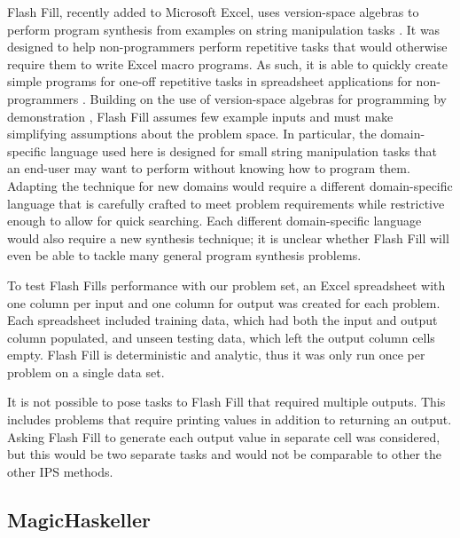Flash Fill, recently added to Microsoft Excel, uses version-space algebras to perform program synthesis from examples on string manipulation tasks \cite{Gulwani2011}. It was designed to help non-programmers perform repetitive tasks that would otherwise require them to write Excel macro programs. As such, it is able to quickly create simple programs for one-off repetitive tasks in spreadsheet applications for non-programmers \cite{Gulwani:2012:SDM:2240236.2240260, harris2011spreadsheet, Singh:2012:LSS:2212351.2212356, singh2012synthesizing}. Building on the use of version-space algebras for programming by demonstration \cite{lau2003programming}, Flash Fill assumes few example inputs and must make simplifying assumptions about the problem space. In particular, the domain-specific language used here is designed for small string manipulation tasks that an end-user may want to perform without knowing how to program them. Adapting the technique for new domains would require a different domain-specific language that is carefully crafted to meet problem requirements while restrictive enough to allow for quick searching. Each different domain-specific language would also require a new synthesis technique; it is unclear whether Flash Fill will even be able to tackle many general program synthesis problems.

To test Flash Fills performance with our problem set, an Excel spreadsheet with one column per input and one column for output was created for each problem. Each spreadsheet included training data, which had both the input and output column populated, and unseen testing data, which left the output column cells empty. Flash Fill is deterministic and analytic, thus it was only run once per problem on a single data set.

It is not possible to pose tasks to Flash Fill that required multiple outputs. This includes problems that require printing values in addition to returning an output. Asking Flash Fill to generate each output value in separate cell was considered, but this would be two separate tasks and would not be comparable to other the other IPS methods.

\subsection{MagicHaskeller}

